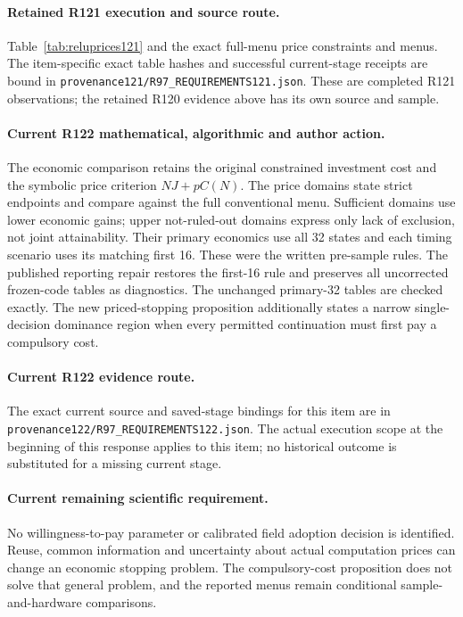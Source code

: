 \paragraph{Retained R121 execution and source route.}
Table~\ref{tab:reluprices121} and the exact full-menu price constraints and menus.
The item-specific exact table hashes and successful current-stage receipts are bound in \nolinkurl{provenance121/R97_REQUIREMENTS121.json}. These are completed R121 observations; the retained R120 evidence above has its own source and sample.
\paragraph{Current R122 mathematical, algorithmic and author action.}
The economic comparison retains the original constrained investment cost and the symbolic price criterion $N J+p C(N)$. The price domains state strict endpoints and compare against the full conventional menu. Sufficient domains use lower economic gains; upper not-ruled-out domains express only lack of exclusion, not joint attainability. Their primary economics use all 32 states and each timing scenario uses its matching first 16. These were the written pre-sample rules. The published reporting repair restores the first-16 rule and preserves all uncorrected frozen-code tables as diagnostics. The unchanged primary-32 tables are checked exactly. The new priced-stopping proposition additionally states a narrow single-decision dominance region when every permitted continuation must first pay a compulsory cost.
\paragraph{Current R122 evidence route.}
The exact current source and saved-stage bindings for this item are in \nolinkurl{provenance122/R97_REQUIREMENTS122.json}. The actual execution scope at the beginning of this response applies to this item; no historical outcome is substituted for a missing current stage.
\paragraph{Current remaining scientific requirement.}
No willingness-to-pay parameter or calibrated field adoption decision is identified. Reuse, common information and uncertainty about actual computation prices can change an economic stopping problem. The compulsory-cost proposition does not solve that general problem, and the reported menus remain conditional sample-and-hardware comparisons.

